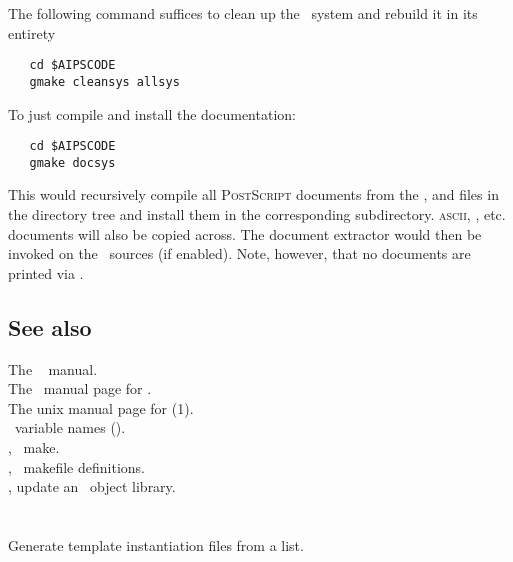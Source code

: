 The following command suffices to clean up the \aipspp\ system and rebuild it
in its entirety

\begin{verbatim}
   cd $AIPSCODE
   gmake cleansys allsys
\end{verbatim}

\noindent
To just compile and install the documentation:

\begin{verbatim}
   cd $AIPSCODE
   gmake docsys
\end{verbatim}

\noindent
This would recursively compile all \textsc{PostScript} documents from the
,  and  files in the
 directory tree and install them in the corresponding
 subdirectory.  \textsc{ascii}, , 
etc.  documents will also be copied across.  The document extractor would then
be invoked on the \cplusplus\ sources (if enabled).  Note, however, that no
documents are printed via .

\subsection*{See also}

The \gnu\  manual.\\
The \gnu\ manual page for .\\
The unix manual page for (1).\\
\aipspp\ variable names ().\\
, \gnu\ make.\\
, \aipspp\ makefile definitions.\\
, update an \aipspp\ object library.

 
\newpage
\section{}
\label{mkinst}

Generate template instantiation files from a list.

